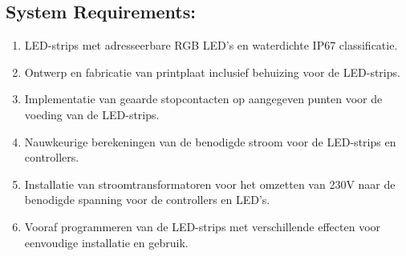 \subsection{System Requirements:}
\begin{enumerate}
    \item LED-strips met adresseerbare RGB LED's en waterdichte IP67 classificatie.
    \item Ontwerp en fabricatie van printplaat inclusief behuizing voor de LED-strips.
    \item Implementatie van geaarde stopcontacten op aangegeven punten voor de voeding van de LED-strips.
    \item Nauwkeurige berekeningen van de benodigde stroom voor de LED-strips en controllers.
    \item Installatie van stroomtransformatoren voor het omzetten van 230V naar de benodigde spanning voor de controllers en LED's.
    \item Vooraf programmeren van de LED-strips met verschillende effecten voor eenvoudige installatie en gebruik.
\end{enumerate}